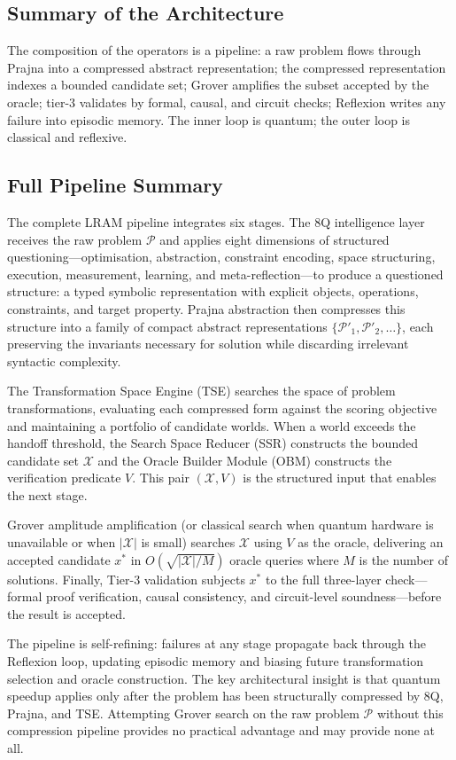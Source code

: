 \subsection{Summary of the Architecture}
The composition of the operators is a pipeline: a raw problem flows through Prajna into a compressed abstract representation; the compressed representation indexes a bounded candidate set; Grover amplifies the subset accepted by the oracle; tier-3 validates by formal, causal, and circuit checks; Reflexion writes any failure into episodic memory. The inner loop is quantum; the outer loop is classical and reflexive.

\subsection{Full Pipeline Summary}


The complete LRAM pipeline integrates six stages. The 8Q intelligence layer receives the raw problem $\mathcal{P}$ and applies eight dimensions of structured questioning---optimisation, abstraction, constraint encoding, space structuring, execution, measurement, learning, and meta-reflection---to produce a questioned structure: a typed symbolic representation with explicit objects, operations, constraints, and target property. Prajna abstraction then compresses this structure into a family of compact abstract representations $\{\mathcal{P}'_1, \mathcal{P}'_2, \ldots\}$, each preserving the invariants necessary for solution while discarding irrelevant syntactic complexity.

The Transformation Space Engine (TSE) searches the space of problem transformations, evaluating each compressed form against the scoring objective and maintaining a portfolio of candidate worlds. When a world exceeds the handoff threshold, the Search Space Reducer (SSR) constructs the bounded candidate set $\mathcal{X}$ and the Oracle Builder Module (OBM) constructs the verification predicate $V$. This pair $(\mathcal{X}, V)$ is the structured input that enables the next stage.

Grover amplitude amplification (or classical search when quantum hardware is unavailable or when $|\mathcal{X}|$ is small) searches $\mathcal{X}$ using $V$ as the oracle, delivering an accepted candidate $x^*$ in $O(\sqrt{|\mathcal{X}|/M})$ oracle queries where $M$ is the number of solutions. Finally, Tier-3 validation subjects $x^*$ to the full three-layer check---formal proof verification, causal consistency, and circuit-level soundness---before the result is accepted.

The pipeline is self-refining: failures at any stage propagate back through the Reflexion loop, updating episodic memory and biasing future transformation selection and oracle construction. The key architectural insight is that quantum speedup applies only after the problem has been structurally compressed by 8Q, Prajna, and TSE. Attempting Grover search on the raw problem $\mathcal{P}$ without this compression pipeline provides no practical advantage and may provide none at all.
